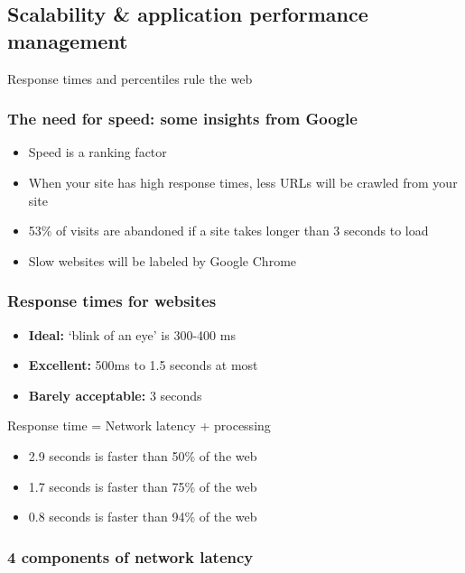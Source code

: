 \documentclass{article}
\begin{document}
\subsection{Scalability \& application performance management}

Response times and percentiles rule the web

\subsubsection{The need for speed: some insights from Google}

\begin{itemize}
    \item Speed is a ranking factor
    \item When your site has high response times, less URLs will be crawled from your site
    \item 53\% of visits are abandoned if a site takes longer than 3 seconds to load
    \item Slow websites will be labeled by Google Chrome
\end{itemize}

\subsubsection{Response times for websites}

\begin{itemize}
    \item \textbf{Ideal:} `blink of an eye' is 300-400 ms
    \item \textbf{Excellent:} 500ms to 1.5 seconds at most
    \item \textbf{Barely acceptable:} 3 seconds
\end{itemize}

Response time = Network latency + processing

\begin{itemize}
    \item 2.9 seconds is faster than 50\% of the web
    \item 1.7 seconds is faster than 75\% of the web
    \item 0.8 seconds is faster than 94\% of the web
\end{itemize}

\subsubsection{4 components of network latency}
\end{document}
